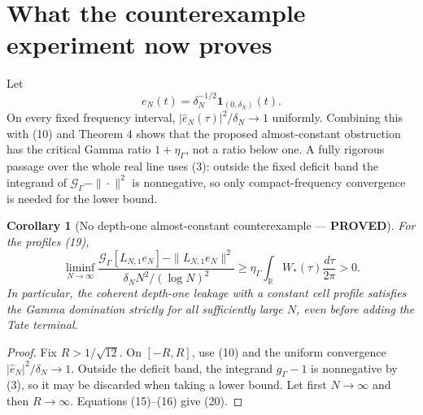 \documentclass[11pt]{article}
\newcommand{\PROVED}{\textcolor{green!40!black}{\textbf{PROVED}}}
\newtheorem{corollary}{Corollary}
\begin{document}
\section{What the counterexample experiment now proves}

Let
\begin{equation}
 e_N(t)=\delta_N^{-1/2}\mathbf1_{(0,\delta_N)}(t).          \tag{19}
\end{equation}
On every fixed frequency interval,
$|\widehat e_N(\tau)|^2/\delta_N\to1$ uniformly.  Combining this with
(10) and Theorem 4 shows that the proposed almost-constant obstruction has
the critical Gamma ratio $1+\eta_\Gamma$, not a ratio below one.  A fully
rigorous passage over the whole real line uses (3): outside the fixed
deficit band the integrand of
$\mathcal G_\Gamma-\|\cdot\|^2$ is nonnegative, so only compact-frequency
convergence is needed for the lower bound.

\begin{corollary}[No depth-one almost-constant counterexample ---
\PROVED]
For the profiles (19),
\begin{equation}
 \liminf_{N\to\infty}
 \frac{
 \mathcal G_\Gamma[L_{N,1}e_N]
 -\|L_{N,1}e_N\|^2}
 {\delta_NN^2/(\log N)^2}
 \ge
 \eta_\Gamma
 \int_{\mathbb R}W_*(\tau)\frac{d\tau}{2\pi}>0.          \tag{20}
\end{equation}
In particular, the coherent depth-one leakage with a constant cell
profile satisfies the Gamma domination strictly for all sufficiently
large $N$, even before adding the Tate terminal.
\end{corollary}

\begin{proof}
Fix $R>1/\sqrt{12}$.  On $[-R,R]$, use (10) and the uniform convergence
$|\widehat e_N|^2/\delta_N\to1$.  Outside the deficit band, the integrand
$g_\Gamma-1$ is nonnegative by (3), so it may be discarded when taking a
lower bound.  Let first $N\to\infty$ and then $R\to\infty$.
Equations (15)--(16) give (20).
\end{proof}
\end{document}
